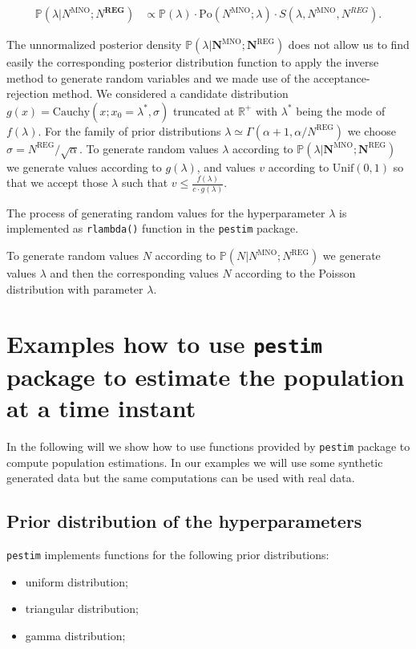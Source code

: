 \documentclass[12pt, a4paper]{article}
\begin{document}
\begin{align}
\mathbb{P}\left(\lambda\big|N^{\textrm{MNO}};N^{\textbf{REG}}\right)&\propto\mathbb{P}\left(\lambda\right)\cdot\textrm{Po}(N^{\textrm{MNO}}; \lambda) \cdot S\left(\lambda, N^{\textrm{MNO}}, N^{REG}\right).\nonumber
\end{align}

The unnormalized posterior density $\mathbb{P}\left(\lambda|\mathbf{N}^{\textrm{MNO}};\mathbf{N}^{\textrm{REG}}\right)$ 
does not allow us to find easily the corresponding posterior distribution function to apply the inverse method to
generate random variables \cite{Dev86a} and we made use of the acceptance-rejection method. 
We considered a candidate distribution $g(x)=\textrm{Cauchy}(x; x_{0}= \lambda^{*}, \sigma)$ 
truncated at $\mathbb{R}^{+}$ with $\lambda^{*}$ being the mode of $f(\lambda)$. 
For the family of prior distributions $\lambda\simeq\Gamma(\alpha + 1, \alpha / N^{\textrm{REG}})$ we choose 
$\sigma = N^{\textrm{REG}}/\sqrt{\alpha}$.
To generate random values $\lambda$ according to $\mathbb{P}\left(\lambda|\mathbf{N}^{\textrm{MNO}};\mathbf{N}^{\textrm{REG}}\right)$ 
we generate values according to $g(\lambda)$, and values $v$ according to $\textrm{Unif}(0,1)$ so that we accept  those $\lambda$ such that $v\leq \frac{f(\lambda)}{c\cdot g(\lambda)}$.

The process of generating random values for the hyperparameter $\lambda$ is  implemented as \texttt{rlambda()}  function in the \texttt{pestim} package.

To generate random values $N$ according to $\mathbb{P}\left(N|N^{\textrm{MNO}};N^{\textrm{REG}}\right)$ we 
generate values $\lambda$ and then the corresponding values $N$ according to the Poisson distribution with parameter $\lambda$. 


\section{Examples how to use \texttt{pestim} package to estimate the population at a time instant}

In the following will we show how to use functions provided by \texttt{pestim} package to compute population estimations. In our examples we will use some synthetic generated data but the same computations can be 
used with real data.

\subsection{Prior distribution of the hyperparameters}
\texttt{pestim} implements functions for the following prior distributions:
\begin{itemize}
	\item uniform distribution;
	\item triangular distribution;
	\item gamma distribution;
\end{itemize}
\end{document}
